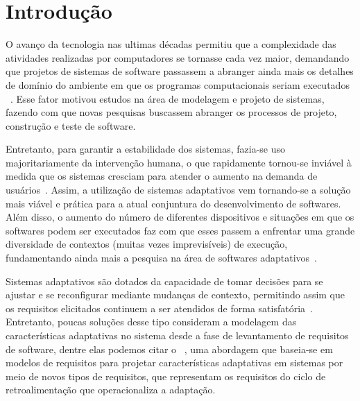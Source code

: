 
\chapter{Introdução}
\label{sec-intro}

O avanço da tecnologia nas ultimas décadas permitiu que a complexidade das atividades realizadas por computadores se tornasse cada vez maior, demandando que projetos de sistemas de software passassem a abranger ainda mais os detalhes de domínio do ambiente em que os programas computacionais seriam executados ~\cite{andersson2009modeling,brun2009engineering}. Esse fator motivou estudos na área de modelagem e projeto de sistemas, fazendo com que novas pesquisas buscassem abranger os processos de projeto, construção e teste de software. 

Entretanto, para garantir a estabilidade dos sistemas, fazia-se uso majoritariamente da intervenção humana, o que rapidamente tornou-se inviável à medida que os sistemas cresciam para atender o aumento na demanda de usuários~\cite{andersson2009modeling}. Assim, a utilização de sistemas adaptativos vem tornando-se a solução mais viável e prática para a atual conjuntura do desenvolvimento de softwares. Além disso, o aumento do número de diferentes dispositivos e situações em que os softwares podem ser executados faz com que esses passem a enfrentar uma grande diversidade de contextos (muitas vezes imprevisíveis) de execução, fundamentando ainda mais a pesquisa na área de softwares adaptativos~\cite{kephart2003vision}.

Sistemas adaptativos são dotados da capacidade de tomar decisões para se ajustar e se reconfigurar mediante mudanças de contexto, permitindo assim que os requisitos elicitados continuem a ser atendidos de forma satisfatória~\cite{souza2012requirement}. Entretanto, poucas soluções desse tipo consideram a modelagem das características adaptativas no sistema desde a fase de levantamento de requisitos de software, dentre elas podemos citar o \zanshin~\cite{tesevitor}, uma abordagem que baseia-se em modelos de requisitos para projetar características adaptativas em sistemas por meio de novos tipos de requisitos, que representam os requisitos do ciclo de retroalimentação que operacionaliza a adaptação.


